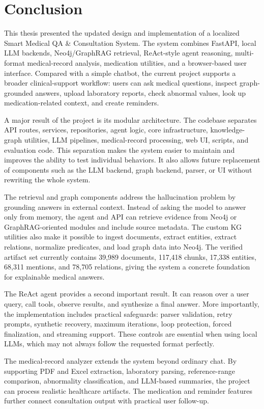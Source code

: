\documentclass[../main.tex]{subfiles}
\begin{document}
\section{Conclusion}
This thesis presented the updated design and implementation of a localized Smart Medical QA \& Consultation System. The system combines FastAPI, local LLM backends, Neo4j/GraphRAG retrieval, ReAct-style agent reasoning, multi-format medical-record analysis, medication utilities, and a browser-based user interface. Compared with a simple chatbot, the current project supports a broader clinical-support workflow: users can ask medical questions, inspect graph-grounded answers, upload laboratory reports, check abnormal values, look up medication-related context, and create reminders.

A major result of the project is its modular architecture. The codebase separates API routes, services, repositories, agent logic, core infrastructure, knowledge-graph utilities, LLM pipelines, medical-record processing, web UI, scripts, and evaluation code. This separation makes the system easier to maintain and improves the ability to test individual behaviors. It also allows future replacement of components such as the LLM backend, graph backend, parser, or UI without rewriting the whole system.

The retrieval and graph components address the hallucination problem by grounding answers in external context. Instead of asking the model to answer only from memory, the agent and API can retrieve evidence from Neo4j or GraphRAG-oriented modules and include source metadata. The custom KG utilities also make it possible to ingest documents, extract entities, extract relations, normalize predicates, and load graph data into Neo4j. The verified artifact set currently contains 39,989 documents, 117,418 chunks, 17,338 entities, 68,311 mentions, and 78,705 relations, giving the system a concrete foundation for explainable medical answers.

The ReAct agent provides a second important result. It can reason over a user query, call tools, observe results, and synthesize a final answer. More importantly, the implementation includes practical safeguards: parser validation, retry prompts, synthetic recovery, maximum iterations, loop protection, forced finalization, and streaming support. These controls are essential when using local LLMs, which may not always follow the requested format perfectly.

The medical-record analyzer extends the system beyond ordinary chat. By supporting PDF and Excel extraction, laboratory parsing, reference-range comparison, abnormality classification, and LLM-based summaries, the project can process realistic healthcare artifacts. The medication and reminder features further connect consultation output with practical user follow-up.
\end{document}
